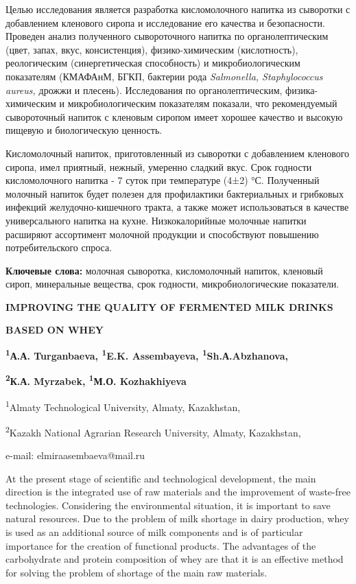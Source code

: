 {{Целью исследования является разработка кисломолочного напитка из
сыворотки с добавлением кленового сиропа и исследование его качества и
безопасности. Проведен анализ полученного сывороточного напитка по
органолептическим (цвет, запах, вкус, консистенция), физико-химическим
(кислотность), реологическим (синергетическая способность) и
микробиологическим показателям (КМАФАнМ, БГКП, бактерии рода
\emph{Salmonella, Staphylococcus aureus,} дрожжи и плесень).
Исследования по органолептическим, физика-химическим и
микробиологическим показателям показали, что рекомендуемый сывороточный
напиток с кленовым сиропом имеет хорошее качество и высокую пищевую и
биологическую ценность.

Кисломолочный напиток, приготовленный из сыворотки с добавлением
кленового сиропа, имел приятный, нежный, умеренно сладкий вкус. Срок
годности кисломолочного напитка - 7 суток при температуре (4±2) °С.
Полученный молочный напиток будет полезен для профилактики бактериальных
и грибковых инфекций желудочно-кишечного тракта, а также может
использоваться в качестве универсального напитка на кухне.
Низкокалорийные молочные напитки расширяют ассортимент молочной
продукции и способствуют повышению потребительского спроса.

{\bfseries Ключевые слова:} молочная сыворотка, кисломолочный напиток,
кленовый сироп, минеральные вещества, срок годности, микробиологические
показатели.

{\bfseries IMPROVING THE QUALITY OF FERMENTED MILK DRINKS}

{\bfseries BASED ON WHEY}

{\bfseries \textsuperscript{1}А.А. Turganbaeva, \textsuperscript{1}E.K.
Assembayeva\textsuperscript{\envelope }, \textsuperscript{1}Sh.А.Abzhanova,}

{\bfseries \textsuperscript{2}К.А. Myrzabek, \textsuperscript{1}М.О.
Kozhakhiyeva}

\textsuperscript{1}Almaty Technological University, Almaty, Kazakhstan,

\textsuperscript{2}Kazakh National Agrarian Research University, Almaty,
Kazakhstan,

e-mail: elmiraasembaeva@mail.ru

At the present stage of scientific and technological development, the
main direction is the integrated use of raw materials and the
improvement of waste-free technologies. Considering the environmental
situation, it is important to save natural resources. Due to the problem
of milk shortage in dairy production, whey is used as an additional
source of milk components and is of particular importance for the
creation of functional products. The advantages of the carbohydrate and
protein composition of whey are that it is an effective method for
solving the problem of shortage of the main raw materials.

}}
